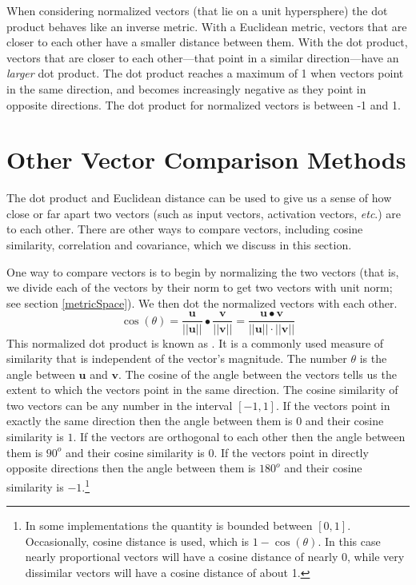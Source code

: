 When considering normalized vectors (that lie on a unit hypersphere) the dot product behaves like an inverse metric. With a Euclidean metric, vectors that are closer to each other have a smaller distance between them. With the dot product, vectors that are closer to each other---that point in a similar direction---have an \emph{larger} dot product. The dot product reaches a maximum of 1 when vectors point in the same direction, and becomes increasingly negative as they point in opposite directions. The dot product for normalized vectors is between -1 and 1.

\section{Other Vector Comparison Methods}\label{vector_comparisons}

The dot product and Euclidean distance can be used to give us a sense of
how close or far apart two vectors (such as input vectors, activation vectors, 
\emph{etc}.) are to each other. There are other ways to compare vectors, including cosine similarity,
correlation and covariance, which we discuss in this section.

   One way to compare vectors is to begin by normalizing the two vectors (that is, we divide each
of the vectors by their norm to get two vectors with unit norm; see 
section \ref{metricSpace}). We then dot the normalized vectors with each 
other.
\begin{equation}\label{E:cossim}
\cos(\theta) = 
\frac{\mathbf{u}}{|| \mathbf{u}||}  \bullet 
\frac{\mathbf{v}}{|| \mathbf{v}||} =
\frac{\mathbf{u} \bullet \mathbf{v}}{|| \mathbf{u}||  \cdot 
||\mathbf{v}||}
\end{equation}
This normalized dot product is known as . It is a 
commonly used measure of similarity that is independent of the vector's 
magnitude. The number $\theta$ is the angle between $\mathbf{u}$ and 
$\mathbf{v}$. The cosine of the angle between the vectors tells us the extent 
to which the vectors point in the same direction. The cosine similarity of two 
vectors can be any number in the interval $[-1, 1]$. If the vectors point in 
exactly the same direction then the angle between them is $0$ and their cosine 
similarity is $1$. If the vectors are orthogonal to each other then the angle
between them is $90^o$ and their cosine similarity is $0$. If the vectors 
point in directly opposite directions then the angle between them is $180^o$ 
and their cosine similarity is $-1$.\footnote{In some implementations the
quantity is bounded between $[0,1]$. Occasionally, cosine distance is used, 
which is $1 - \cos(\theta)$. In this case nearly proportional vectors 
will have a cosine distance of nearly 0, while very dissimilar vectors will 
have a cosine distance of about 1.}

